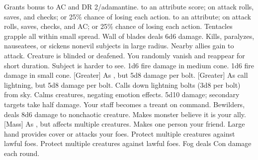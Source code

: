     {Grants  bonus to AC and DR 2/adamantine.}
    { to an attribute score;  on attack rolls, saves, and checks; or 25\% chance of losing each action.}
    { to an attribute;  on attack rolls, saves, checks, and AC; or 25\% chance of losing each action.}
    {Tentacles grapple all within small spread.}
    {Wall of blades deals 6d6 damage.}
    {Kills, paralyzes, nauseatees, or sickens nonevil subjects in large radius.}
    {Nearby allies gain  to attack.}
    {Creature is blinded or deafened.}
    {You randomly vanish and reappear for short duration.}
    {Subject is harder to see.}
    {1d6 fire damage in medium cone.}
    {1d6 fire damage in small cone.}
[Greater]
    {As , but 5d8 damage per bolt.}
[Greater]
    {As call lightning, but 5d8 damage per bolt.}
    {Calls down lightning bolts (3d8 per bolt) from sky.}
    {Calms creatures, negating emotion effects.}
    {5d10 damage; secondary targets take half damage.}
    {Your staff becomes a treant on command.}
    {Bewilders, deals 8d6 damage to nonchaotic creature.}
    {Makes monster believe it is your ally.}
[Mass]
    {As , but affects multiple creatures.}
    {Makes one person your friend.}
    {Large hand provides cover or attacks your foes.}
    {Protect multiple creatures against lawful foes. }
    {Protect multiple creatures against lawful foes.}
    {Fog deals Con damage each round.}
